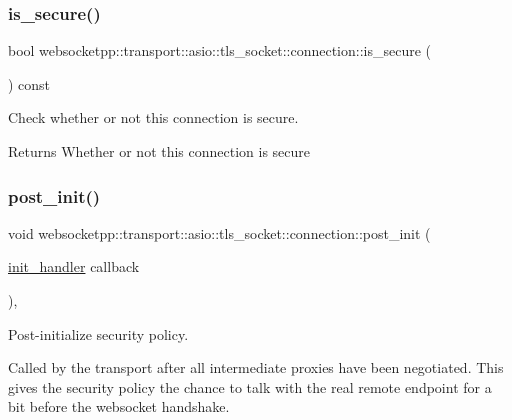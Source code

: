 \subsubsection{\texorpdfstring{is\+\_\+secure()}{is\_secure()}}
{\footnotesize\ttfamily bool websocketpp\+::transport\+::asio\+::tls\+\_\+socket\+::connection\+::is\+\_\+secure (\begin{DoxyParamCaption}{ }\end{DoxyParamCaption}) const\hspace{0.3cm}{\ttfamily [inline]}}



Check whether or not this connection is secure. 

\begin{DoxyReturn}{Returns}
Whether or not this connection is secure 
\end{DoxyReturn}
\mbox{\label{classwebsocketpp_1_1transport_1_1asio_1_1tls__socket_1_1connection_aac77e88754c55f2cd67a90adf47fc2f0}} 
\subsubsection{\texorpdfstring{post\+\_\+init()}{post\_init()}}
{\footnotesize\ttfamily void websocketpp\+::transport\+::asio\+::tls\+\_\+socket\+::connection\+::post\+\_\+init (\begin{DoxyParamCaption}\item[{\mbox{\hyperlink{namespacewebsocketpp_1_1transport_aeae75e675c1a334b3b33ab7120b480a5}{init\+\_\+handler}}}]{callback }\end{DoxyParamCaption})\hspace{0.3cm}{\ttfamily [inline]}, {\ttfamily [protected]}}



Post-\/initialize security policy. 

Called by the transport after all intermediate proxies have been negotiated. This gives the security policy the chance to talk with the real remote endpoint for a bit before the websocket handshake.


